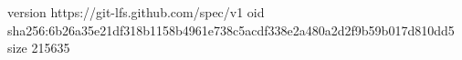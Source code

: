 version https://git-lfs.github.com/spec/v1
oid sha256:6b26a35e21df318b1158b4961e738c5acdf338e2a480a2d2f9b59b017d810dd5
size 215635
